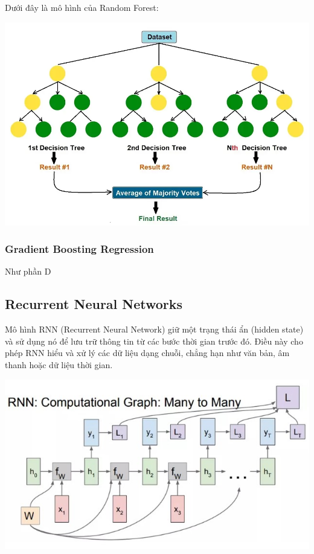\documentclass{ieeeojies}
\begin{document}
Dưới đây là mô hình của Random Forest:
\begin{center}
\begin{minipage}{0.4\textwidth}
\includegraphics[width=1\textwidth]{bibliography/pictures/RandomForest.jpg}
\end{minipage}    
\end{center}


\subsubsection{Gradient Boosting Regression}
Như phần D

\subsection{Recurrent Neural Networks} 
Mô hình RNN (Recurrent Neural Network) giữ một trạng thái ẩn (hidden state) và sử dụng nó để lưu trữ thông tin từ các bước thời gian trước đó. Điều này cho phép RNN hiểu và xử lý các dữ liệu dạng chuỗi, chẳng hạn như văn bản, âm thanh hoặc dữ liệu thời gian.
\begin{center}
\begin{minipage}{0.4\textwidth}
\includegraphics[width=1\textwidth]
{bibliography/pictures/RNN.jpg}
\end{minipage}    
\end{center}
\end{document}
